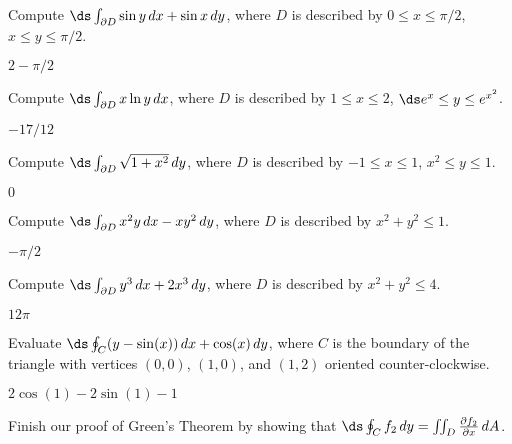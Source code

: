 \begin{enumialphparenastyle}
\begin{ex}
Compute $\ds\int_{\partial D} \sin y\,dx + \sin x\,dy$, 
where $D$ is described by $0\le x\le \pi/2$, $x\le y\le \pi/2$.
\begin{sol}
	$2-\pi/2$
\end{sol}
\end{ex}

\begin{ex}
Compute $\ds\int_{\partial D} x\ln y\,dx$,
where $D$ is described by $1\le x\le 2$, $\ds e^x\le y\le e^{x^2}$.
\begin{sol}
	$-17/12$
\end{sol}
\end{ex}

\begin{ex}
Compute $\ds\int_{\partial D} \sqrt{1+x^2}\,dy$, 
where $D$ is described by $-1\le x\le 1$, $x^2\le y\le 1$.
\begin{sol}
	$0$
\end{sol}
\end{ex}

\begin{ex}
Compute $\ds\int_{\partial D} x^2y\,dx - xy^2\,dy$, 
where $D$ is described by $x^2+y^2\le 1$.
\begin{sol}
	$-\pi/2$
\end{sol}
\end{ex}

\begin{ex}
Compute $\ds\int_{\partial D} y^3\,dx + 2x^3\,dy$, 
where $D$ is described by $x^2+y^2\le 4$.
\begin{sol}
	$12\pi$
\end{sol}
\end{ex}

\begin{ex}
Evaluate $\ds\oint_C (y-\sin(x))\,dx + \cos(x) \, dy$,
where $C$ is the boundary of the triangle with vertices $(0,0)$,
$(1,0)$, and $(1,2)$ oriented counter-clockwise.
\begin{sol}
	$2\cos(1)-2\sin(1)-1$
\end{sol}
\end{ex}

\begin{ex}
Finish our proof of Green's Theorem by showing that
$\ds\oint_C f_2\,dy=\iint_{D} {\partial f_2\over\partial x}\,dA$.
\end{ex}

\end{enumialphparenastyle}
